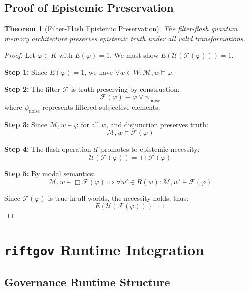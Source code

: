 \documentclass[11pt,a4paper]{article}
\newtheorem{theorem}{Theorem}
\begin{document}
\subsection{Proof of Epistemic Preservation}

\begin{theorem}[Filter-Flash Epistemic Preservation]
The filter-flash quantum memory architecture preserves epistemic truth under all valid transformations.
\end{theorem}

\begin{proof}
Let $\varphi \in K$ with $E(\varphi) = 1$. We must show $E(\mathcal{U}(\mathcal{F}(\varphi))) = 1$.

\textbf{Step 1:} Since $E(\varphi) = 1$, we have $\forall w \in W: \mathcal{M}, w \vDash \varphi$.

\textbf{Step 2:} The filter $\mathcal{F}$ is truth-preserving by construction:
$$\mathcal{F}(\varphi) \equiv \varphi \lor \psi_{\text{noise}}$$
where $\psi_{\text{noise}}$ represents filtered subjective elements.

\textbf{Step 3:} Since $\mathcal{M}, w \vDash \varphi$ for all $w$, and disjunction preserves truth:
$$\mathcal{M}, w \vDash \mathcal{F}(\varphi)$$

\textbf{Step 4:} The flash operation $\mathcal{U}$ promotes to epistemic necessity:
$$\mathcal{U}(\mathcal{F}(\varphi)) = \Box \mathcal{F}(\varphi)$$

\textbf{Step 5:} By modal semantics:
$$\mathcal{M}, w \vDash \Box \mathcal{F}(\varphi) \iff \forall w' \in R(w): \mathcal{M}, w' \vDash \mathcal{F}(\varphi)$$

Since $\mathcal{F}(\varphi)$ is true in all worlds, the necessity holds, thus:
$$E(\mathcal{U}(\mathcal{F}(\varphi))) = 1$$
\end{proof}

\section{\texttt{riftgov} Runtime Integration}

\subsection{Governance Runtime Structure}
\end{document}
